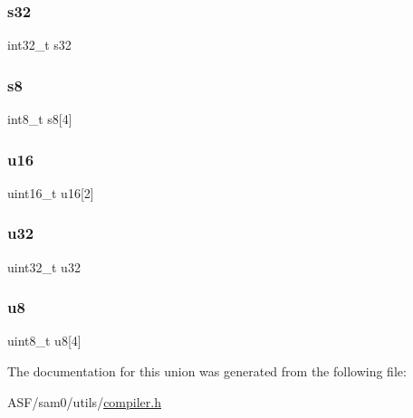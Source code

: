 \subsubsection{\texorpdfstring{s32}{s32}}
{\footnotesize\ttfamily int32\+\_\+t s32}

\mbox{\label{union_union32_a77e1b7a79d4140f7c79c9d77f2a5068b}} 
\subsubsection{\texorpdfstring{s8}{s8}}
{\footnotesize\ttfamily int8\+\_\+t s8\mbox{[}4\mbox{]}}

\mbox{\label{union_union32_a3afd84b866f8cca1b10c0fa139028c96}} 
\subsubsection{\texorpdfstring{u16}{u16}}
{\footnotesize\ttfamily uint16\+\_\+t u16\mbox{[}2\mbox{]}}

\mbox{\label{union_union32_ae65af0c4a8ee050043fe4b575f0a26a0}} 
\subsubsection{\texorpdfstring{u32}{u32}}
{\footnotesize\ttfamily uint32\+\_\+t u32}

\mbox{\label{union_union32_a4dacc7e50619978e3e003e36ec24e302}} 
\subsubsection{\texorpdfstring{u8}{u8}}
{\footnotesize\ttfamily uint8\+\_\+t u8\mbox{[}4\mbox{]}}



The documentation for this union was generated from the following file\+:\begin{DoxyCompactItemize}
\item 
A\+S\+F/sam0/utils/\mbox{\hyperlink{compiler_8h}{compiler.\+h}}\end{DoxyCompactItemize}
